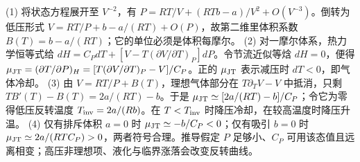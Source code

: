 (1) 将状态方程展开至 \(V^{-2}\)，有 \(P=RT/V+(RTb-a)/V^2+O(V^{-3})\)。倒转为低压形式 \(V=RT/P+b-a/(RT)+O(P)\)，故第二维里体积系数 \(B(T)=b-a/(RT)\)；它的单位必须是体积每摩尔。
(2) 对一摩尔体系，热力学恒等式给 \(dH=C_PdT+[V-T(\partial V/\partial T)_P]dP\)。令节流近似等焓 \(dH=0\)，便得 \(\mu_{\rm JT}=(\partial T/\partial P)_H=[T(\partial V/\partial T)_P-V]/C_P\)。正的 \(\mu_{\rm JT}\) 表示减压时 \(dT<0\)，即气体冷却。
(3) 由 \(V=RT/P+B(T)\)，理想气体部分在 \(T\partial_TV-V\) 中抵消，只剩 \(T B'(T)-B(T)=2a/(RT)-b\)。于是 \(\mu_{\rm JT}\simeq[2a/(RT)-b]/C_P\)；令它为零得低压反转温度 \(T_{\rm inv}=2a/(Rb)\)。在 \(T<T_{\rm inv}\) 时降压冷却，在较高温度时降压升温。
(4) 仅有排斥体积 \(a=0\) 时 \(\mu_{\rm JT}\simeq-b/C_P<0\)；仅有吸引 \(b=0\) 时 \(\mu_{\rm JT}\simeq2a/(RTC_P)>0\)，两者符号合理。推导假定 \(P\) 足够小、\(C_P\) 可用该态值且远离相变；高压非理想项、液化与临界涨落会改变反转曲线。
